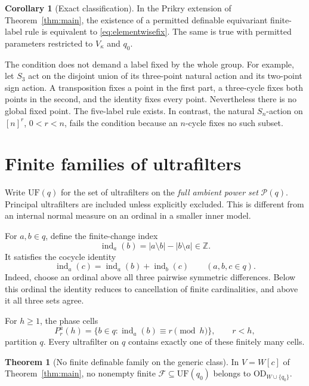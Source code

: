 \documentclass[11pt,letterpaper]{article}
\theoremstyle{definition}
\newtheorem{theorem}[definition]{Theorem}
\newtheorem{corollary}[definition]{Corollary}
\numberwithin{equation}{section}
\newcommand{\OD}{\mathrm{OD}}
\newcommand{\UF}{\mathrm{UF}}
\newcommand{\Pow}{\mathcal P}
\newcommand{\FFam}{\mathscr F}
\newcommand{\ind}{\operatorname{ind}}
\newcommand{\Z}{\mathbb Z}
\begin{document}
\begin{corollary}[Exact classification]\label{cor:classification}
In the Prikry extension of Theorem~\ref{thm:main}, the existence of a permitted definable equivariant finite-label rule is equivalent to \eqref{eq:elementwisefix}. The same is true with permitted parameters restricted to $V_\kappa$ and $q_0$.
\end{corollary}

The condition does not demand a label fixed by the whole group. For example, let $S_3$ act on the disjoint union of its three-point natural action and its two-point sign action. A transposition fixes a point in the first part, a three-cycle fixes both points in the second, and the identity fixes every point. Nevertheless there is no global fixed point. The five-label rule exists. In contrast, the natural $S_n$-action on $[n]^r$, $0<r<n$, fails the condition because an $n$-cycle fixes no such subset.

\section{Finite families of ultrafilters}\label{sec:ufnegative}

Write $\UF(q)$ for the set of ultrafilters on the \emph{full ambient power set} $\Pow(q)$. Principal ultrafilters are included unless explicitly excluded. This is different from an internal normal measure on an ordinal in a smaller inner model.

For $a,b\in q$, define the finite-change index
\[
 \ind_a(b)=|a\setminus b|-|b\setminus a|\in\Z.
 \label{eq:index}\tag{7}
\]
It satisfies the cocycle identity
\[
 \ind_a(c)=\ind_a(b)+\ind_b(c)
 \qquad(a,b,c\in q).
 \label{eq:cocycle}\tag{8}
\]
Indeed, choose an ordinal above all three pairwise symmetric differences. Below this ordinal the identity reduces to cancellation of finite cardinalities, and above it all three sets agree.

For $h\ge1$, the phase cells
\[
 P_r^a(h)=\{b\in q:\ind_a(b)\equiv r\pmod h\},
 \qquad r<h,
 \label{eq:phase}\tag{9}
\]
partition $q$. Every ultrafilter on $q$ contains exactly one of these finitely many cells.

\begin{theorem}[No finite definable family on the generic class]\label{thm:ufnegative}
In $V=W[c]$ of Theorem~\ref{thm:main}, no nonempty finite
$\FFam\subseteq\UF(q_0)$ belongs to $\OD_{W\cup\{q_0\}}$.
\end{theorem}
\end{document}
